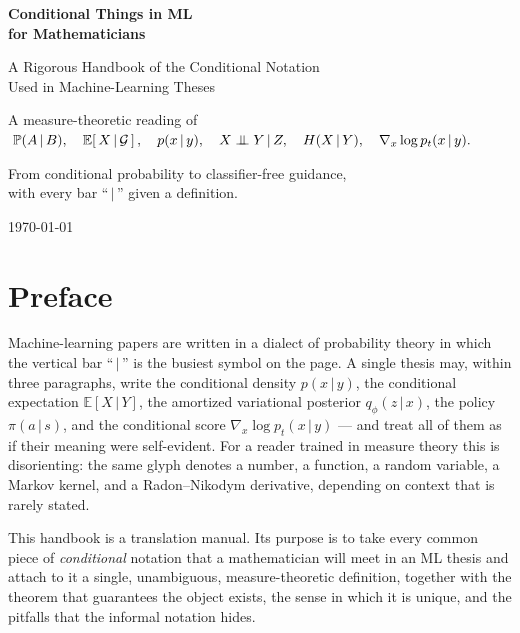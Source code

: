 \documentclass[11pt,oneside]{report}
\theoremstyle{plain}
\theoremstyle{definition}
\theoremstyle{remark}
\newcommand{\Prob}{\mathbb{P}}
\newcommand{\E}{\mathbb{E}}
\newcommand{\Gcal}{\mathcal{G}}
\newcommand{\given}{\,\vert\,}
\newcommand{\indep}{\mathrel{\perp\mkern-10mu\perp}}
\newcommand{\cE}[2]{\E\!\left[\,#1 \,\middle|\, #2\,\right]}
\numberwithin{equation}{chapter}
\begin{document}
\begin{titlepage}
\centering
\vspace*{3.5cm}
{\Huge\bfseries Conditional Things in ML\\[0.35em] for Mathematicians\par}
\vspace{1.2cm}
{\Large A Rigorous Handbook of the Conditional Notation\\
Used in Machine-Learning Theses\par}
\vfill
{\large A measure-theoretic reading of $\;\Prob(A\given B),\quad
\cE{X}{\Gcal},\quad p(x\given y),\quad X\indep Y\given Z,\quad
H(X\given Y),\quad \nabla_x\log p_t(x\given y).$\par}
\vfill
{\large From conditional probability to classifier-free guidance,\\
with every bar ``$\,\vert\,$'' given a definition.\par}
\vspace{2cm}
{\large\today\par}
\end{titlepage}

\tableofcontents

\chapter*{Preface}

Machine-learning papers are written in a dialect of probability theory in
which the vertical bar ``$\,\vert\,$'' is the busiest symbol on the page.
A single thesis may, within three paragraphs, write the conditional
density $p(x\given y)$, the conditional expectation $\E[X\given Y]$, the
amortized variational posterior $q_\phi(z\given x)$, the policy
$\pi(a\given s)$, and the conditional score $\nabla_x\log p_t(x\given y)$
--- and treat all of them as if their meaning were self-evident. For a
reader trained in measure theory this is disorienting: the same glyph
denotes a number, a function, a random variable, a Markov kernel, and a
Radon--Nikodym derivative, depending on context that is rarely stated.

This handbook is a translation manual. Its purpose is to take every
common piece of \emph{conditional} notation that a mathematician will
meet in an ML thesis and attach to it a single, unambiguous,
measure-theoretic definition, together with the theorem that guarantees
the object exists, the sense in which it is unique, and the pitfalls that
the informal notation hides.
\end{document}
